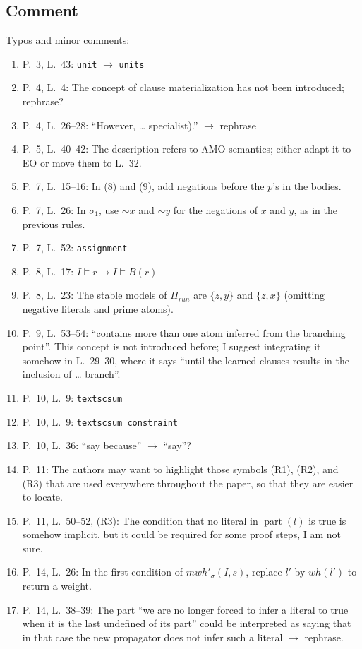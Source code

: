 \documentclass[11pt]{article}
\theoremstyle{definition}
\newcommand{\revieweranswered}{\subsection{Comment}}
\begin{document}
\vspace{0.5cm}
\revieweranswered
Typos and minor comments:
\begin{enumerate}
    \item P.~3, L.~43: \texttt{unit} $\rightarrow$ \texttt{units}
    
    \item P.~4, L.~4: The concept of clause materialization has not been introduced; rephrase?
    
    \item P.~4, L.~26--28: ``However, \ldots{} specialist).'' $\rightarrow$ rephrase
    \item P.~5, L.~40--42: The description refers to AMO semantics; either adapt it to EO or move them to L.~32.
    \item P.~7, L.~15--16: In (8) and (9), add negations before the $p$'s in the bodies.
    \item P.~7, L.~26: In $\sigma_1$, use $\sim x$ and $\sim y$ for the negations of $x$ and $y$, as in the previous rules.
    \item P.~7, L.~52: \texttt{assignment}
    \item P.~8, L.~17: $I \models r \rightarrow I \models B(r)$
    \item P.~8, L.~23: The stable models of $\Pi_{run}$ are $\{z,y\}$ and $\{z,x\}$ (omitting negative literals and prime atoms).
    \item P.~9, L.~53--54: ``contains more than one atom inferred from the branching point''. This concept is not introduced before; I suggest integrating it somehow in L.~29--30, where it says ``until the learned clauses results in the inclusion of \ldots{} branch''.
    \item P.~10, L.~9: \texttt{textscsum}
    \item P.~10, L.~9: \texttt{textscsum constraint}
    \item P.~10, L.~36: ``say because'' $\rightarrow$ ``say''?
    \item P.~11: The authors may want to highlight those symbols (R1), (R2), and (R3) that are used everywhere throughout the paper, so that they are easier to locate.
    \item P.~11, L.~50--52, (R3): The condition that no literal in $\operatorname{part}(l)$ is true is somehow implicit, but it could be required for some proof steps, I am not sure.
    \item P.~14, L.~26: In the first condition of $mwh'_\sigma(I,s)$, replace $l'$ by $wh(l')$ to return a weight.
    \item P.~14, L.~38--39: The part ``we are no longer forced to infer a literal to true when it is the last undefined of its part'' could be interpreted as saying that in that case the new propagator does not infer such a literal $\rightarrow$ rephrase.
    

\end{enumerate}
\end{document}
